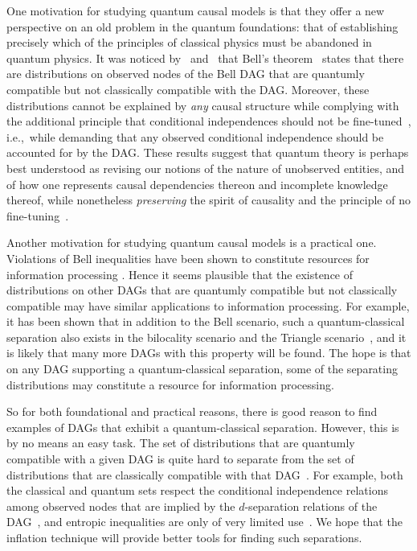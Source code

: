 \documentclass[aps,english,superscriptaddress,onecolumn,twoside,longbibliography,pra,floatfix,fleqn,nofootinbib]{revtex4-1}%
\theoremstyle{definition}
\newcounter{example}[section]
\begin{document}
One motivation for studying quantum causal models is that they offer a new perspective on an old  problem in the quantum foundations: that of establishing precisely which of the principles of classical physics must be abandoned in quantum physics. It was noticed by~\citet{fritz2012bell} and~\citet{WoodSpekkens} that Bell's theorem~\cite{bell1966lhvm} states that there are distributions on observed nodes of the Bell DAG that are quantumly compatible but not classically compatible with the DAG. Moreover, these distributions cannot be explained by \emph{any} causal structure while complying with the additional principle that conditional independences should not be fine-tuned~\cite{WoodSpekkens}, i.e.,~while demanding that any observed conditional independence should be accounted for by the DAG. These results suggest that quantum theory is perhaps best understood as revising our notions of the nature of unobserved entities, and of how one represents causal dependencies thereon and incomplete knowledge thereof, while 
nonetheless {\em preserving} the spirit of causality and the principle of no fine-tuning~\cite{leifer2013conditionalstates,Spekkens2015paradigm,henson2011ontic}.

Another motivation for studying quantum causal models is a practical one.  Violations of Bell inequalities have  been shown to constitute resources for information processing \cite{NoSigPolytope,scarani2012device,BancalDIApproach}. Hence it seems plausible that the existence of distributions on other DAGs that are quantumly compatible but not classically compatible may have similar applications to information processing. 
For example, it has been shown that in addition to the Bell scenario, such a quantum-classical separation also exists 
in the bilocality scenario \cite{BilocalCorrelations} and the Triangle scenario~\cite{fritz2012bell}, and it is likely that many more DAGs with this property will be found.  The hope is that on any DAG supporting a quantum-classical separation, some of the separating distributions may constitute a resource for information processing. 

So for both foundational and practical reasons, there is good reason to find examples of DAGs that exhibit a quantum-classical separation.
However, this is by no means an easy task.
The set of distributions that are quantumly compatible with a given DAG is quite hard to separate from the set of distributions that are classically compatible with that DAG~\cite{pusey2014gdag,fritz2012bell}. For example, both the classical and quantum sets respect the conditional independence relations among observed nodes that are implied by the $d$-separation relations of the DAG~\cite{pusey2014gdag}, and entropic inequalities are only of very limited use~\cite{chaves2012entropic,fritz2012bell}. We hope that the inflation technique will provide better tools for finding such separations.
\end{document}
